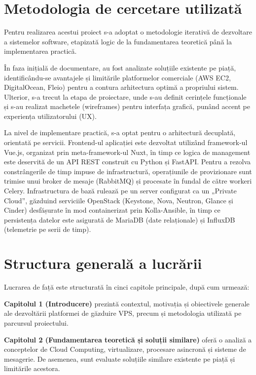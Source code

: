 \section{Metodologia de cercetare utilizată}

Pentru realizarea acestui proiect s-a adoptat o metodologie iterativă de dezvoltare a sistemelor software, etapizată logic de la fundamentarea teoretică până la implementarea practică. 

În faza inițială de documentare, au fost analizate soluțiile existente pe piață, identificându-se avantajele și limitările platformelor comerciale (AWS EC2, DigitalOcean, Fleio) pentru a contura arhitectura optimă a propriului sistem. Ulterior, s-a trecut la etapa de proiectare, unde s-au definit cerințele funcționale și s-au realizat machetele (wireframes) pentru interfața grafică, punând accent pe experiența utilizatorului (UX).

La nivel de implementare practică, s-a optat pentru o arhitectură decuplată, orientată pe servicii. Frontend-ul aplicației este dezvoltat utilizând framework-ul Vue.js, organizat prin meta-framework-ul Nuxt, în timp ce logica de management este deservită de un API REST construit cu Python și FastAPI. Pentru a rezolva constrângerile de timp impuse de infrastructură, operațiunile de provizionare sunt trimise unui broker de mesaje (RabbitMQ) și procesate în fundal de către workeri Celery. Infrastructura de bază rulează pe un server configurat ca un „Private Cloud”, găzduind serviciile OpenStack (Keystone, Nova, Neutron, Glance și Cinder) desfășurate în mod containerizat prin Kolla-Ansible, în timp ce persistența datelor este asigurată de MariaDB (date relaționale) și InfluxDB (telemetrie pe serii de timp).

\section{Structura generală a lucrării}

Lucrarea de față este structurată în cinci capitole principale, după cum urmează:

\textbf{Capitolul 1 (Introducere)} prezintă contextul, motivația și obiectivele generale ale dezvoltării platformei de găzduire VPS, precum și metodologia utilizată pe parcursul proiectului.

\textbf{Capitolul 2 (Fundamentarea teoretică și soluții similare)} oferă o analiză a conceptelor de Cloud Computing, virtualizare, procesare asincronă și sisteme de mesagerie. De asemenea, sunt evaluate soluțiile similare existente pe piață și limitările acestora.

